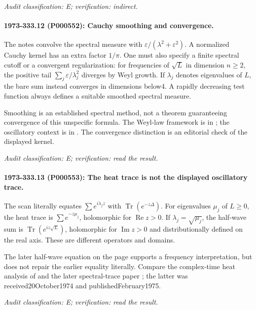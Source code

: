 \emph{Audit classification: E; verification: indirect.}

\paragraph{1973-333.12 (P000552): Cauchy smoothing and convergence.}
The notes convolve the spectral measure with \(\varepsilon/(\lambda^2+\varepsilon^2)\). A normalized Cauchy kernel has an extra factor \(1/\pi\). One must also specify a finite spectral cutoff or a convergent regularization: for frequencies of \(\sqrt L\) in dimension \(n\ge2\), the positive tail \(\sum_j\varepsilon/\lambda_j^2\) diverges by Weyl growth. If \(\lambda_j\) denotes eigenvalues of \(L\), the bare sum instead converges in dimensions below4. A rapidly decreasing test function always defines a suitable smoothed spectral measure.

Smoothing is an established spectral method, not a theorem guaranteeing convergence of this unspecific formula. The Weyl-law framework is in \citet[\S1]{mckeansinger1967curvature}; the oscillatory context is in \citet{colindeverdiere1973geodesicsii}. The convergence distinction is an editorial check of the displayed kernel.

\emph{Audit classification: E; verification: read the result.}

\paragraph{1973-333.13 (P000553): The heat trace is not the displayed oscillatory trace.}
The scan literally equates \(\sum e^{i\lambda_jz}\) with \(\operatorname{Tr}(e^{-z\Delta})\). For eigenvalues \(\mu_j\) of \(L\ge0\), the heat trace is \(\sum e^{-z\mu_j}\), holomorphic for \(\operatorname{Re}z>0\). If \(\lambda_j=\sqrt{\mu_j}\), the half-wave sum is \(\operatorname{Tr}(e^{iz\sqrt L})\), holomorphic for \(\operatorname{Im}z>0\) and distributionally defined on the real axis. These are different operators and domains.

The later half-wave equation on the page supports a frequency interpretation, but does not repair the earlier equality literally. Compare the complex-time heat analysis of \citet{colindeverdiere1973geodesicsii} and the later spectral-trace paper \citet{duistermaatguillemin1975spectrum}; the latter was received20October1974 and publishedFebruary1975.

\emph{Audit classification: E; verification: read the result.}

